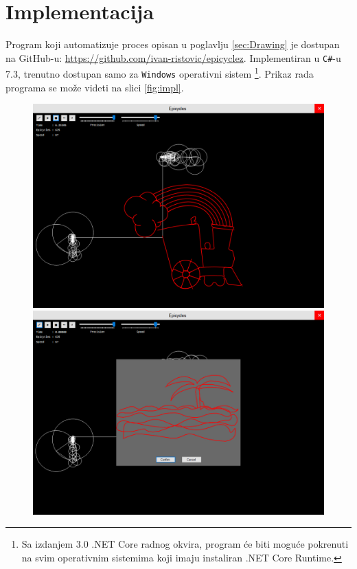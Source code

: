\section{Implementacija}
\label{sec:impl}

Program koji automatizuje proces opisan u poglavlju \ref{sec:Drawing} je dostupan na GitHub-u: \url{https://github.com/ivan-ristovic/epicyclez}. Implementiran u \texttt{C\#}-u 7.3, trenutno dostupan samo za \texttt{Windows} operativni sistem \footnote{Sa izdanjem 3.0 .NET Core radnog okvira, program \'c{}e biti mogu\'c{}e pokrenuti na svim operativnim sistemima koji imaju instaliran .NET Core Runtime.}. Prikaz rada programa se mo\v{z}e videti na slici \ref{fig:impl}.

\begin{figure}
    \centering
    \includegraphics[scale=0.37]{images/impl1.PNG}
    \includegraphics[scale=0.37]{images/impl2.PNG}

\end{figure}
